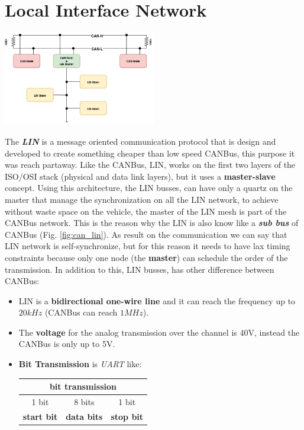 \newpage
\section{Local Interface Network}
\begin{center}
    \label{fig:can_lin}
    \includegraphics[width=0.5\textwidth]{img/can_lin}
\end{center}
The \textbf{\textit{LIN}} is a message oriented communication protocol that is design and developed to create something cheaper than low speed CANBus, this purpose it was reach partaway. Like the CANBus, LIN, works on the first two layers of the ISO/OSI stack (physical and data link layers), but it uses a \textbf{master-slave} concept. Using this architecture, the LIN busses, can have only a quartz on the master that manage the synchronization on all the LIN network, to achieve without waste space on the vehicle, the master of the LIN mesh is part of the CANBus network. This is the reason why the LIN is also know like a \textbf{\textit{sub bus}} of CANBus (Fig. \ref{fig:can_lin}). As result on the communication we can say that LIN network is self-synchronize, but for this reason it needs to have lax timing constraints because only one node (the \textbf{master}) can schedule the order of the transmission. In addition to this, LIN busses, has other difference between CANBus:
\begin{itemize}[nosep]
    \item LIN is a \textbf{bidirectional one-wire line} and it can reach the frequency up to $20kHz$ (CANBus can reach $1MHz$).
    \item The \textbf{voltage} for the analog transmission over the channel is 40V, instead the CANBus is only up to 5V.
    \item \textbf{Bit Transmission} is \textit{UART} like:
    \begin{center}
        \begin{tabular}{ | c | c | c | } \hline
            \multicolumn{3}{|c|}{\textbf{bit transmission}} \\ \hline
            1 bit & 8 bits & 1 bit \\ \hline
            \textbf{start bit} & \textbf{data bits} & \textbf{stop bit} \\ \hline
        \end{tabular}
    \end{center}
\end{itemize}
